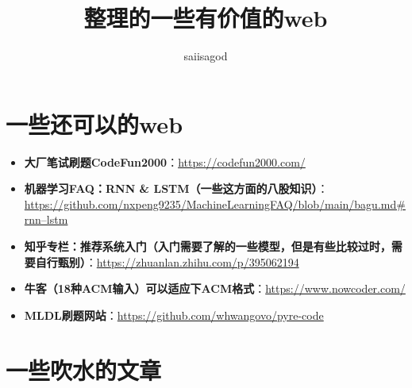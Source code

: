 \documentclass{article}
\title{整理的一些有价值的web}
\author{saiisagod}
\date{}
\begin{document}
\maketitle

\section*{一些还可以的web}

\begin{itemize}
    \item \textbf{大厂笔试刷题CodeFun2000}：\href{https://codefun2000.com/}{https://codefun2000.com/}
    \item \textbf{机器学习FAQ：RNN \& LSTM（一些这方面的八股知识）}：\href{https://github.com/nxpeng9235/MachineLearningFAQ/blob/main/bagu.md#rnn--lstm}{https://github.com/nxpeng9235/MachineLearningFAQ/blob/main/bagu.md\#rnn--lstm}
    \item \textbf{知乎专栏：推荐系统入门（入门需要了解的一些模型，但是有些比较过时，需要自行甄别）}：\href{https://zhuanlan.zhihu.com/p/395062194}{https://zhuanlan.zhihu.com/p/395062194}
    \item \textbf{牛客（18种ACM输入）可以适应下ACM格式}：\href{https://www.nowcoder.com/}{https://www.nowcoder.com/}
    \item \textbf{MLDL刷题网站}：\href{https://github.com/whwangovo/pyre-code}{https://github.com/whwangovo/pyre-code}
\end{itemize}
\section*{一些吹水的文章}
\begin{itemize}

\end{itemize}
\end{document}
